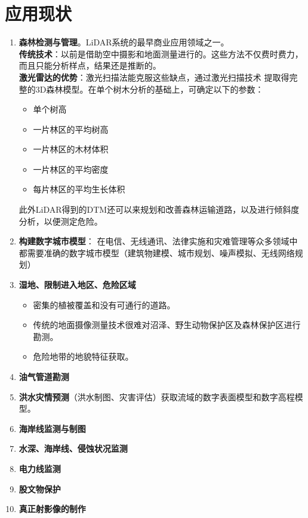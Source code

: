 \section{应用现状}
\begin{enumerate}
	\item %
	\textbf{森林检测与管理}。LiDAR系统的最早商业应用领域之一。\\
	\textbf{传统技术}：以前是借助空中摄影和地面测量进行的。这些方法不仅费时费力，而且只能分析样点，结果还是推断的。\\
	\textbf{激光雷达的优势}：激光扫描法能克服这些缺点，通过激光扫描技术
	提取得完整的3D森林模型。在单个树木分析的基础上，可确定以下的参数：\begin{itemize}
		\item 单个树高
		\item 一片林区的平均树高
		\item 一片林区的木材体积
		\item 一片林区的平均密度
		\item 每片林区的平均生长体积
	\end{itemize} 
	此外LiDAR得到的DTM还可以来规划和改善森林运输道路，以及进行倾斜度分析，以便测定危险。
	\item %
	\textbf{构建数字城市模型}：
	在电信、无线通讯、法律实施和灾难管理等众多领域中都需要准确的数字城市模型（建筑物建模、城市规划、噪声模拟、无线网络规划）
	\item %
	\textbf{湿地、限制进入地区、危险区域}
	\begin{itemize}
		\item 密集的植被覆盖和没有可通行的道路。
		\item 传统的地面摄像测量技术很难对沼泽、野生动物保护区及森林保护区进行勘测。
		\item 危险地带的地貌特征获取。
	\end{itemize}
	\item \textbf{油气管道勘测}
	\item \textbf{洪水灾情预测}（洪水制图、灾害评估）获取流域的数字表面模型和数字高程模型。
	\item \textbf{海岸线监测与制图}
	\item \textbf{水深、海岸线、侵蚀状况监测}
	\item \textbf{电力线监测}
	\item \textbf{股文物保护}
	\item \textbf{真正射影像的制作}
\end{enumerate}

